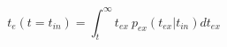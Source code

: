 \begin{equation}
t_e(t=t_{in}) =\int_t^{\infty} t_{ex}\ p_{ex}(t_{ex}|t_{in}) dt_{ex}
\end{equation}